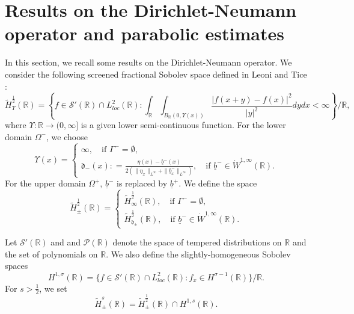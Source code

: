 \documentclass[12pt]{amsart}
\theoremstyle{definition}
\numberwithin{equation}{section}
\newcommand{\R}{\mathbb{R}}
\newcommand{\f}{\frac}
\begin{document}
\section{Results on the Dirichlet-Neumann operator and parabolic estimates} \label{s:DNOperator}
In this section, we recall some results on the Dirichlet-Neumann operator.
We consider the following screened fractional Sobolev space defined in Leoni and Tice \cite{MR3989147}:
\begin{equation*}
 \widetilde{H}^\f{1}{2}_\Upsilon (\R) = \left\{ f\in \mathcal{S}'(\R) \cap L^2_{loc}(\R) : \int_\R \int_{B_{\R}(0, \Upsilon(x))} \dfrac{|f(x+y ) - f(x)|^2}{|y|^2} dydx < \infty  \right\} / \R, 
\end{equation*}
where $\Upsilon : \R \rightarrow (0, \infty]$ is a given lower semi-continuous function.
For the lower domain $\Omega^-$, we choose
\begin{equation*}
\Upsilon(x) = \begin{cases}
\infty, \quad \text{if }  \Gamma^- = \emptyset, \\
\mathfrak{d}_- (x): = \frac{\eta(x) - \underline{b}^-(x)}{2(\| \eta_x\|_{L^\infty} + \| \underline{b}^-_x\|_{L^\infty})}, \quad \text{if } \underline{b}^- \in \dot{W}^{1,\infty}(\R). 
\end{cases}
\end{equation*}
For the upper domain $\Omega^+$, $\underline{b}^-$ is replaced by $\underline{b}^+$. 
We define the space
\begin{equation*}
 \widetilde{H}^\f{1}{2}_\pm (\R) = \begin{cases}
\widetilde{H}^\f{1}{2}_\infty (\R), \quad \text{if }  \Gamma^- = \emptyset, \\
\widetilde{H}^\f{1}{2}_{\mathfrak{d}_\pm}(\R), \quad \text{if } \underline{b}^- \in \dot{W}^{1,\infty}(\R). 
\end{cases}
\end{equation*}

Let $\mathcal{S}'(\R)$ and and $\mathcal{P}(\R)$ denote the space of tempered distributions on $\R$ and the set of polynomials on $\R$.
We also define the slightly-homogeneous Sobolev spaces
\begin{equation*}
H^{1,\sigma}(\R) = \{f \in \mathcal{S}'(\R)\cap L^2_{loc}(\R): f_x \in H^{\sigma-1}(\R) \}/ \R .
\end{equation*}
For $s>\f12$, we set 
\begin{equation*}
   \widetilde{H}^s_\pm (\R) = \widetilde{H}^\f{1}{2}_\pm(\R)\cap H^{1,s}(\R). 
\end{equation*}
\end{document}
